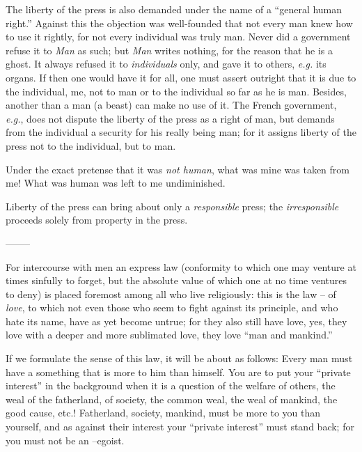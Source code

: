 The liberty of the press is also demanded under the name of a ``general human 
right.'' Against this the objection was well-founded that not every man knew 
how to use it rightly, for not every individual was truly man. Never did a 
government refuse it to \textit{Man} as such; but \textit{Man} writes nothing, 
for the reason that he is a ghost. It always refused it to 
\textit{individuals} only, and gave it to others, \textit{e.g.} its organs. 
If then one would have it for all, one must assert outright that it is due to 
the individual, me, not to man or to the individual so far as he is man. 
Besides, another than a man (a beast) can make no use of it. The French 
government, \textit{e.g.}, does not dispute the liberty of the press as a 
right of man, but demands from the individual a security for his really being 
man; for it assigns liberty of the press not to the individual, but to man.

Under the exact pretense that it was \textit{not human}, what was mine was 
taken from me! What was human was left to me undiminished.

Liberty of the press can bring about only a \textit{responsible} press; the 
\textit{irresponsible} proceeds solely from property in the press.

\begin{center}
--------\end{center}


For intercourse with men an express law (conformity to which one may venture 
at times sinfully to forget, but the absolute value of which one at no time 
ventures to deny) is placed foremost among all who live religiously: this is 
the law -- of \textit{love}, to which not even those who seem to fight against 
its principle, and who hate its name, have as yet become untrue; for they also 
still have love, yes, they love with a deeper and more sublimated love, they 
love ``man and mankind.''

If we formulate the sense of this law, it will be about as follows: Every man 
must have a something that is more to him than himself. You are to put your 
``private interest'' in the background when it is a question of the welfare 
of others, the weal of the fatherland, of society, the common weal, the weal 
of mankind, the good cause, etc.! Fatherland, society, mankind, must be more 
to you than yourself, and as against their interest your ``private 
interest'' must stand back; for you must not be an --egoist.


